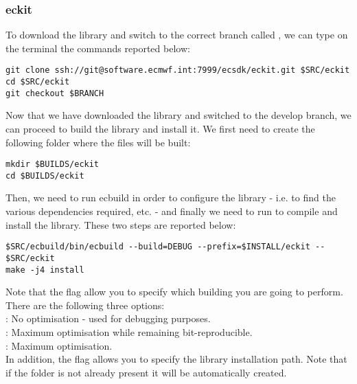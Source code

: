 \subsubsection{eckit}
To download the library and switch to the correct branch called 
, we can type on the terminal the commands reported 
below:
%
\begin{lstlisting}[style=BashStyle]
git clone ssh://git@software.ecmwf.int:7999/ecsdk/eckit.git $SRC/eckit
cd $SRC/eckit
git checkout $BRANCH
\end{lstlisting}
%
Now that we have downloaded the library and switched 
to the develop branch, we can proceed to build the 
library and install it. We first need to create the 
following folder where the files will be built:
%
\begin{lstlisting}[style=BashStyle]
mkdir $BUILDS/eckit
cd $BUILDS/eckit
\end{lstlisting}
%
Then, we need to run ecbuild in order to configure the 
library - i.e. to find the various dependencies required, 
etc. - and finally we need to run  
to compile and install the library. These two steps are 
reported below:
%
\begin{lstlisting}[style=BashStyle]
$SRC/ecbuild/bin/ecbuild --build=DEBUG --prefix=$INSTALL/eckit -- $SRC/eckit
make -j4 install
\end{lstlisting}
%
Note that the flag  allow you to specify which 
building you are going to perform. There are the following 
three options:\\
: No optimisation - used for debugging purposes.\\
: Maximum optimisation while remaining bit-reproducible.\\
: Maximum optimisation.\\
In addition, the flag  allows you to specify 
the library installation path. Note that if the folder  
is not already present it will be automatically created.




